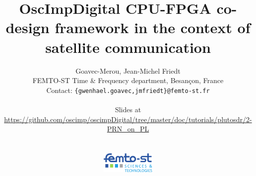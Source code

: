 \documentclass[compress,10pt]{beamer}
\begin{document}
\author[G. Goavec- Merou \& al.]{Goavec-Merou, Jean-Michel Friedt\\
{\footnotesize
FEMTO-ST Time \& Frequency department, Besan\c con, France \\ 
}
Contact: {\tt \{gwenhael.goavec,jmfriedt\}@femto-st.fr} \\ \vspace{0.6cm}
\begin{center}
Slides at \\
\url{https://github.com/oscimp/oscimpDigital/tree/master/doc/tutorials/plutosdr/2-PRN_on_PL}\\\ \\ \ \\
\includegraphics[height=1cm]{logo_femto.pdf}\vspace{-1cm}
\end{center}
}
\title[]{OscImpDigital CPU-FPGA co-design framework in the context of satellite communication}

\begin{frame}
\titlepage
\end{frame}


\end{document}
